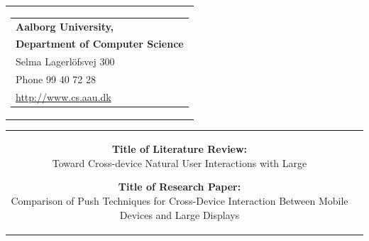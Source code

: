 


\thispagestyle{empty}

\begin{nopagebreak}
{\samepage

\begin{tabular}{r}
	\parbox{\textwidth}
	{  
		\hspace{3.7cm} \parbox{0cm}
		{
			\begin{tabular}{l}
			{\small \textbf{Aalborg University,}}\\
			{\small \textbf{Department of Computer Science}}\\
			
			{\small Selma Lagerlöfsvej 300} \\
			{\small Phone 99 40 72 28} \\
			{\small \url{http://www.cs.aau.dk}}
			\end{tabular}
		}
		\vspace{2cm}
	}
\end{tabular}

\begin{tabular}{cc}
\parbox{8cm}{

\begin{description}

\item {\textbf{Title of Literature Review:}}\\
Toward Cross-device Natural User Interactions with Large
\item {\textbf{Title of Research Paper:}}\\ 
Comparison of Push Techniques for Cross-Device Interaction Between Mobile Devices and Large Displays


\end{description}}
\end{tabular}}
\end{nopagebreak}
